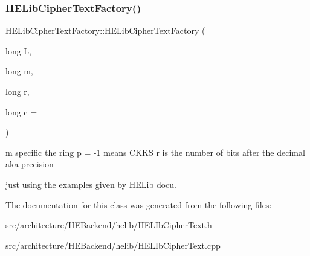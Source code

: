 \subsubsection{\texorpdfstring{H\+E\+Lib\+Cipher\+Text\+Factory()}{HELibCipherTextFactory()}\hspace{0.1cm}{\footnotesize\ttfamily [2/2]}}
{\footnotesize\ttfamily H\+E\+Lib\+Cipher\+Text\+Factory\+::\+H\+E\+Lib\+Cipher\+Text\+Factory (\begin{DoxyParamCaption}\item[{long}]{L,  }\item[{long}]{m,  }\item[{long}]{r,  }\item[{long}]{c = {} }\end{DoxyParamCaption})\hspace{0.3cm}{\ttfamily [inline]}}

m specific the ring p = -\/1 means C\+K\+KS r is the number of bits after the decimal aka precision

just using the examples given by H\+E\+Lib docu. 

The documentation for this class was generated from the following files\+:\begin{DoxyCompactItemize}
\item 
src/architecture/\+H\+E\+Backend/helib/H\+E\+L\+Ib\+Cipher\+Text.\+h\item 
src/architecture/\+H\+E\+Backend/helib/H\+E\+L\+Ib\+Cipher\+Text.\+cpp\end{DoxyCompactItemize}
